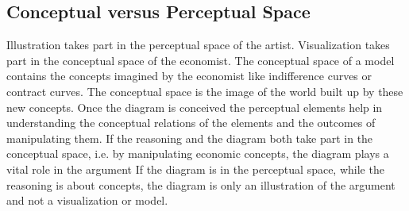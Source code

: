\documentclass[a4paper, 12pt]{article}
\begin{document}
\subsection*{Conceptual versus Perceptual Space}
Illustration takes part in the perceptual space of the artist. Visualization takes part in the conceptual space of the economist. The conceptual space of a model contains the concepts imagined by the economist like indifference curves or contract curves. The conceptual space is the image of the world built up by these new concepts. Once the diagram is conceived the perceptual elements help in understanding the conceptual relations of the elements and the outcomes of manipulating them. If the reasoning and the diagram both take part in the conceptual space, i.e. by manipulating economic concepts, the diagram plays a vital role in the argument If the diagram is in the perceptual space, while the reasoning is about concepts, the diagram is only an illustration of the argument and not a visualization or model.
\end{document}
